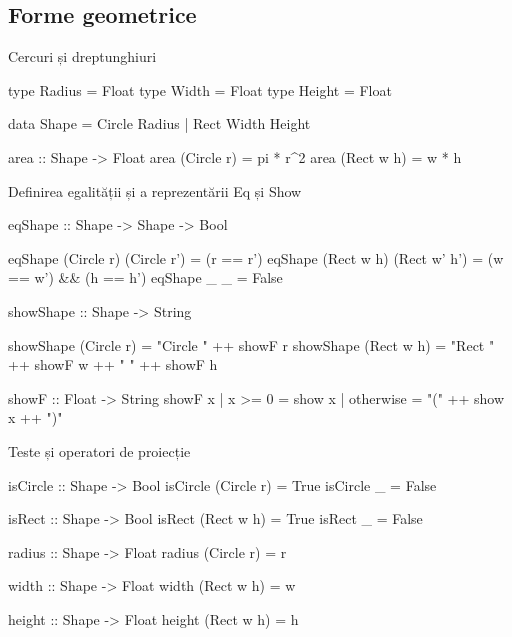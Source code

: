 \documentclass[handout,xcolor=pdftex,romanian,colorlinks]{beamer}
\begin{document}
\subsection{Forme geometrice}

\begin{frame}[fragile]{Cercuri și dreptunghiuri}
\begin{asciihs}
  type   Radius   =   Float
  type   Width    =   Float
  type   Height   =   Float

  data   Shape    =   Circle Radius
                  |   Rect Width Height

  area :: Shape -> Float
  area (Circle r) = pi * r^2
  area (Rect w h) = w * h
\end{asciihs}
\end{frame}


\begin{frame}[fragile]{Definirea egalității și a reprezentării}
{Eq și Show}
\begin{asciihs}
  eqShape :: Shape -> Shape -> Bool
\end{asciihs}
\vspace{-2ex}
\begin{asciihs}
  eqShape (Circle r) (Circle r')  = (r == r')
  eqShape (Rect w h) (Rect w' h') = (w == w') && (h == h')
  eqShape _          _            = False

\end{asciihs}
\begin{asciihs}
  showShape :: Shape -> String
\end{asciihs}
\vspace{-2ex}
\begin{asciihs}
  showShape (Circle r) = "Circle " ++ showF r
  showShape (Rect w h) = "Rect " ++ showF w 
      ++ " " ++ showF h

  showF :: Float -> String
  showF x | x >= 0     = show x
          | otherwise = "(" ++ show x ++ ")"
\end{asciihs}
\end{frame}

\begin{frame}[fragile]{Teste și operatori de proiecție}
\begin{asciihs}
  isCircle :: Shape -> Bool
  isCircle (Circle r) = True
  isCircle _          = False

  isRect :: Shape -> Bool
  isRect (Rect w h) = True
  isRect _          = False

  radius :: Shape -> Float
  radius (Circle r) = r

  width :: Shape -> Float
  width (Rect w h) = w

  height :: Shape -> Float
  height (Rect w h) = h
\end{asciihs}
\end{frame}
\end{document}
